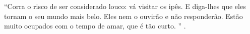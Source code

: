 \begin{epigrafe}%

``Corra o risco de ser considerado louco: vá visitar os ipês. E diga-lhes que eles tornam o seu mundo mais belo. Eles nem o ouvirão e não responderão. Estão muito ocupados com o tempo de amar, que é tão curto. ''  \cite{alves2008}.

\end{epigrafe}
